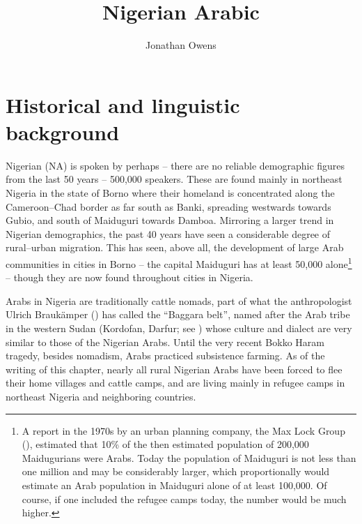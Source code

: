 \documentclass[output=paper]{langsci/langscibook}
\author{Jonathan Owens\affiliation{University of Bayreuth}}
\title{Nigerian Arabic}
\begin{document}
\section{
Historical and linguistic background
}

Nigerian  (NA) is spoken by perhaps – there are no reliable demographic figures from the last 50 years – 500,000 speakers. These are found mainly in northeast Nigeria in the state of {Borno} where their homeland is concentrated along the Cameroon--Chad border as far south as Banki, spreading westwards towards Gubio, and south of Maiduguri towards Damboa. Mirroring a larger trend in Nigerian demographics, the past 40 years have seen a considerable degree of rural–urban migration. This has seen, above all, the development of large Arab communities in cities in {Borno} – the capital Maiduguri has at least 50,000 alone\footnote{A report in the 1970s by an urban planning company, the Max Lock Group (\citeyear{MaxLockGroup1976}), estimated that 10\% of the then estimated population of 200,000 Maidugurians were Arabs. Today the population of Maiduguri is not less than one million and may be considerably larger, which proportionally would estimate an Arab population in Maiduguri alone of at least 100,000. Of course, if one included the refugee camps today, the number would be much higher.} – though they are now found throughout cities in Nigeria.

Arabs in Nigeria are traditionally cattle nomads, part of what the anthropologist Ulrich Braukämper (\citeyear{Braukämper1994}) has called the “Baggara belt”, named after the Arab tribe in the western Sudan (Kordofan, Darfur; see \citealt{Manfredi2010}) whose culture and dialect are very similar to those of the Nigerian Arabs. Until the very recent Bokko Haram tragedy, besides nomadism, Arabs practiced subsistence farming. As of the writing of this chapter, nearly all rural Nigerian Arabs have been forced to flee their home villages and cattle camps, and are living mainly in refugee camps in northeast Nigeria and neighboring countries.
\end{document}
